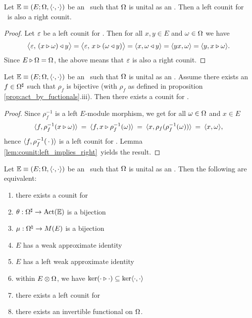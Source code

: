 \begin{lemma} \label{lem:counit:left_implies_right}
Let\/ $\mathbb{E} \equiv (E; \Omega, \langle\cdot, \cdot\rangle)$ be an \context\ such that\/ $\Omega$ is unital as an\/ \Ebimod\@.
Then a left counit for\/ \EE\ is also a right counit.
\end{lemma}
\begin{proof}
Let $\varepsilon$ be a left counit for \EE\@. Then for all $x,y \in E$ and $\omega \in \Omega$ we have
$$ \pairM{\eps}{(x \lact \om) \ract y}
       = \pairM{\eps}{x \lact (\om \ract y)}
       = \pair{x}{\om \ract y}
       = \pair{yx}{\om}
       = \pair{y}{x \lact \om}.  $$
Since $E\triangleright\Omega = \Omega$, the above means that $\varepsilon$ is also a right counit.
\end{proof}



\begin{lemma} \label{lem:counit:existence}
Let\/ $\mathbb{E} \equiv (E; \Omega, \langle\cdot, \cdot\rangle)$ be an \context\ such that\/ $\Omega$ is unital as an\/ \Ebimod\@.
Assume\/ there exists an\/ $f\in \Omega^\sharp$ such that\/ $\rho_f$ is bijective
(with\/ $\rho_f$ as defined in proposition \ref{prop:act_by_fuctionals}.iii).
Then there exists a counit for\/ \EE.
\end{lemma}
\begin{proof}
Since $\rho_f^{-1}$ is a left $E$-module morphism, we get for all $\omega \in \Omega$ and $x\in E$
$$ \langle f,\rho_f^{-1}(x \triangleright \omega) \rangle
       \:=\: \langle f,x \triangleright \rho_f^{-1}(\omega) \rangle
       \:=\: \langle x,\rho_f(\rho_f^{-1}(\omega)) \rangle
       \:=\: \langle x,\omega \rangle,   $$
hence $\langle f,\rho_f^{-1}(\,\cdot\,) \rangle$ is a left counit for \EE\@.
Lemma \ref{lem:counit:left_implies_right}\ yields the result.
\end{proof}



\begin{prop} \label{prop:weakly_unital}
  Let\/ $\mathbb{E} \equiv (E; \Omega, \langle\cdot, \cdot\rangle)$ be an \context\ such that\/ $\Omega$ is unital as an\/ \Ebimod\@.
  Then the following are equivalent:
  \begin{enumerate}
     \item there exists a counit for\/ \EE
     \item $\theta: \Omega^\sharp \rightarrow \mbox{\rm Act}(\mathbb{E})$ is a bijection
     \item $\mu: \Omega^\natural \rightarrow M(E)$ is a bijection
     \item $E$ has a weak approximate identity
     \item $E$ has a left weak approximate identity
     \item within $E\otimes \Omega$, we have\/ $\ker(\cdot \triangleright \cdot) \subseteq \ker\langle\cdot, \cdot\rangle$
     \item there exists a left counit for\/ \EE
     \item there exists an\/ \EEdash invertible functional on\/ $\Omega$.
  \end{enumerate}
\end{prop}

